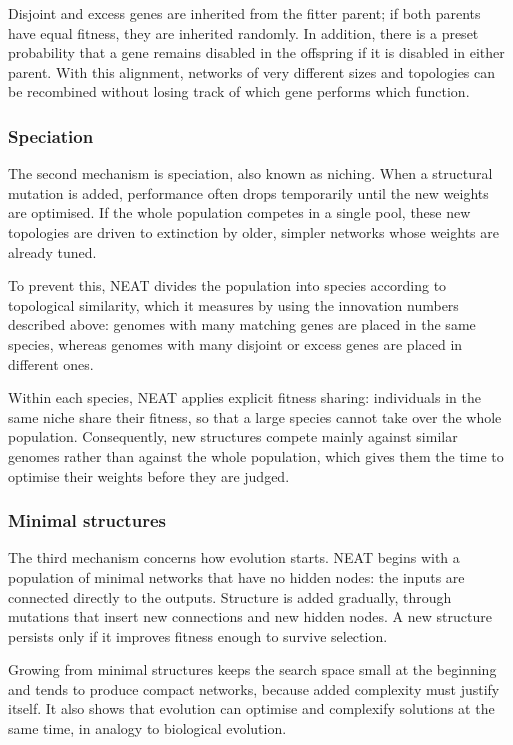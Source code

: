 Disjoint and excess genes are inherited from the fitter parent; if both parents have equal fitness, they are inherited randomly. In addition, there is a preset probability that a gene remains disabled in the offspring if it is disabled in either parent. With this alignment, networks of very different sizes and topologies can be recombined without losing track of which gene performs which function.

\FloatBarrier
\subsubsection{Speciation}
The second mechanism is speciation, also known as niching. When a structural mutation is added, performance often drops temporarily until the new weights are optimised. If the whole population competes in a single pool, these new topologies are driven to extinction by older, simpler networks whose weights are already tuned.

To prevent this, NEAT divides the population into species according to topological similarity, which it measures by using the innovation numbers described above: genomes with many matching genes are placed in the same species, whereas genomes with many disjoint or excess genes are placed in different ones.

Within each species, NEAT applies explicit fitness sharing: individuals in the same niche share their fitness, so that a large species cannot take over the whole population. Consequently, new structures compete mainly against similar genomes rather than against the whole population, which gives them the time to optimise their weights before they are judged.

\subsubsection{Minimal structures}
The third mechanism concerns how evolution starts. NEAT begins with a population of minimal networks that have no hidden nodes: the inputs are connected directly to the outputs. Structure is added gradually, through mutations that insert new connections and new hidden nodes. A new structure persists only if it improves fitness enough to survive selection.

Growing from minimal structures keeps the search space small at the beginning and tends to produce compact networks, because added complexity must justify itself. It also shows that evolution can optimise and complexify solutions at the same time, in analogy to biological evolution.

